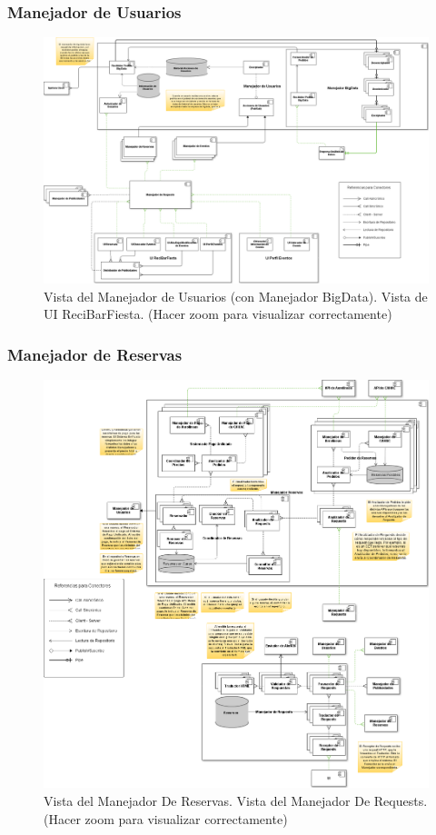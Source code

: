 \subsubsection{Manejador de Usuarios}

\begin{figure}[H]
  \centering
  \includegraphics[width=\textwidth]{diagramas/ManejadorDeUsuarios.png}
  \caption{\normalfont Vista del Manejador de Usuarios (con Manejador BigData). Vista de UI ReciBarFiesta. (Hacer zoom para visualizar correctamente)}
\end{figure} 

\subsubsection{Manejador de Reservas}

\begin{figure}[H]
  \centering
  \includegraphics[width=\textwidth]{diagramas/ManejadorReservas.png}
  \caption{\normalfont Vista del Manejador De Reservas. Vista del Manejador De Requests. (Hacer zoom para visualizar correctamente)}
\end{figure} 

